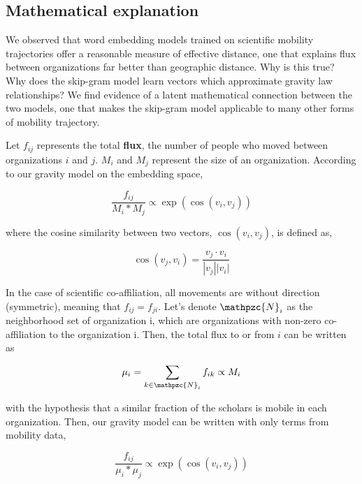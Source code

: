 \documentclass[12pt]{article} %
\begin{document}
%
%
\subsection*{Mathematical explanation}

We observed that word embedding models trained on scientific mobility trajectories offer a reasonable measure of effective distance, one that explains flux between organizations far better than geographic distance. 
Why is this true?
Why does the skip-gram model learn vectors which approximate gravity law relationships?
We find evidence of a latent mathematical connection between the two models, one that makes the skip-gram model applicable to many other forms of mobility trajectory. 

Let $f_{ij}$ represents the total \textbf{flux}, the number of people who moved between organizations $i$ and $j$. $M_{i}$ and $M_{j}$ represent the size of an organization. According to our gravity model on the embedding space,

\begin{equation}
    \label{eq:gravity_model}
    \frac{f_{ij}}{M_{i} * M_{j}} \propto \exp(\cos(v_i,v_j))
\end{equation}

where the cosine similarity between two vectors, $\cos(v_{i}, v_{j})$, is defined as,

\begin{equation}
    \cos(v_j, v_i) = \frac{v_j \cdot v_i}{|v_j||v_i|} 
\end{equation}

In the case of scientific co-affiliation, all movements are without direction (symmetric), meaning that  $f_{ij} = f_{ji}$.
Let's denote $\mathpzc{N}_i$ as the neighborhood set of organization i, which are organizations with non-zero co-affiliation to the organization i.
Then, the total flux to or from $i$ can be written as 

\begin{equation}
    \mu_{i} = \sum_{k\in\mathpzc{N}_i} f_{ik} \propto M_i
\end{equation} 

with the hypothesis that a similar fraction of the scholars is mobile in each organization. Then, our gravity model can be written with only terms from mobility data, 

\begin{equation}
    \label{eq:gravity_model_approx}
    \frac{f_{ij}}{\mu_i * \mu_j} \propto \exp(\cos(v_i,v_j))
\end{equation}
\end{document}
